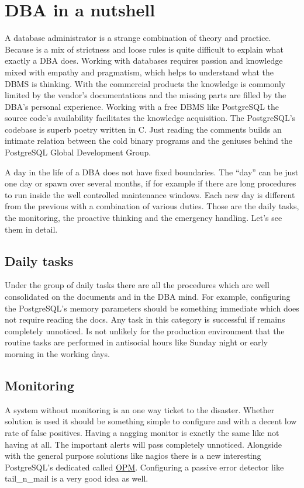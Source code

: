 \chapter{DBA in a nutshell}
A database administrator is a strange combination of theory and practice. Because is a mix of strictness 
and loose rules is quite difficult to explain what exactly a DBA does. Working with databases requires 
passion and knowledge mixed with empathy and pragmatism, which helps to understand what 
the DBMS is thinking. With the commercial products the knowledge is commonly limited by the vendor's 
documentations and the missing parts are filled by the DBA's personal experience. Working with a free DBMS 
like PostgreSQL the source code's availability facilitates the knowledge acquisition. The PostgreSQL's 
codebase is superb poetry written in C. Just reading the comments builds an intimate relation between the 
cold binary programs and the geniuses behind the PostgreSQL Global Development Group.\newline

A day in the life of a DBA does not have fixed boundaries. The ``day'' can be just one day or spawn 
over several months, if for example if there are long procedures to run inside the well controlled 
maintenance windows. Each new day is different from the previous with a combination of various duties. 
Those are the daily tasks, the monitoring, the proactive thinking and the emergency handling. Let's see 
them in detail.

\section{Daily tasks}
Under the group of daily tasks there are all the procedures which are well consolidated on the documents 
and in the DBA mind. For example, configuring the PostgreSQL's memory parameters should be something 
immediate which does not require reading the docs. Any task in this category is successful if remains 
completely unnoticed. Is not unlikely for the production environment that the routine tasks are 
performed in antisocial hours like Sunday night or early morning in the working days.

\section{Monitoring}
A system without monitoring is an one way ticket to the disaster. Whether solution is used it should be 
something simple to configure and with a decent low rate of false positives. Having a nagging monitor is 
exactly the same like not having at all. The important alerts will pass completely unnoticed. Alongside 
with the general purpose solutions like nagios there is a new interesting PostgreSQL's dedicated called 
\href{http://opm.io/}{OPM}. Configuring a passive error detector like tail\_n\_mail is a very good idea as 
well. 

